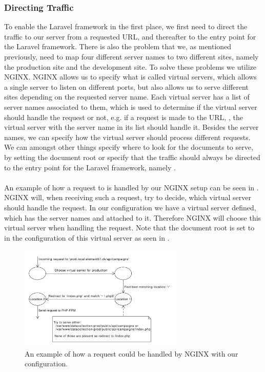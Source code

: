 \subsubsection{Directing Traffic}
\label{ssub:directing_traffic}
To enable the Laravel framework in the first place, we first need to direct the traffic to our server from a requested URL, and thereafter to the entry point for the Laravel framework. There is also the problem that we, as mentioned previously, need to map four different server names to two different sites, namely the production site and the development site. To solve these problems we utilize NGINX. NGINX allows us to specify what is called virtual servers, which allows a single server to listen on different ports, but also allows us to serve different sites depending on the requested server name. Each virtual server has a list of server names associated to them, which is used to determine if the virtual server should handle the request or not, e.g. if a request is made to the URL, , the virtual server with the server name  in its list should handle it. 
Besides the server names, we can specify how the virtual server should process different requests. We can amongst other things specify where to look for the documents to serve, by setting the document root or specify that the traffic should always be directed to the entry point for the Laravel framework, namely . 
\\\\
An example of how a request to  is handled by our NGINX setup can be seen in . NGINX will, when receiving such a request, try to decide, which virtual server should handle the request. In our configuration we have a virtual server defined, which has the server names  and  attached to it. Therefore NGINX will choose this virtual server when handling the request. Note that the document root is set to  in the configuration of this virtual server as seen in .
\\
\begin{figure}[!htbp]
    \centering
    \includegraphics[width=0.7\textwidth]{graphic/architecture/NGINX_workflow.pdf}
    \caption{An example of how a request could be handled by NGINX with our configuration.}
    \label{fig:NGINX_workflow}
\end{figure}
\FloatBarrier

